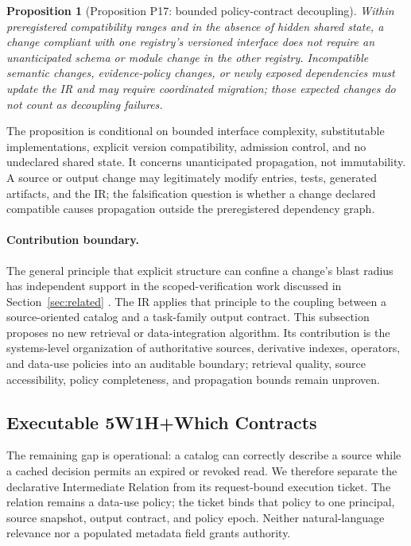 \documentclass[11pt]{article}
\newtheorem{proposition}{Proposition}
\begin{document}
\begin{proposition}[Proposition P17: bounded policy-contract decoupling]
\label{prop:p17}
Within preregistered compatibility ranges and in the absence of hidden shared state, a change compliant with one registry's versioned interface does not require an unanticipated schema or module change in the other registry. Incompatible semantic changes, evidence-policy changes, or newly exposed dependencies must update the IR and may require coordinated migration; those expected changes do not count as decoupling failures.
\end{proposition}

The proposition is conditional on bounded interface complexity, substitutable implementations, explicit version compatibility, admission control, and no undeclared shared state. It concerns unanticipated propagation, not immutability. A source or output change may legitimately modify entries, tests, generated artifacts, and the IR; the falsification question is whether a change declared compatible causes propagation outside the preregistered dependency graph.

\paragraph{Contribution boundary.}
The general principle that explicit structure can confine a change's blast radius has independent support in the scoped-verification work discussed in Section~\ref{sec:related} \cite{hsu2026grace}. The IR applies that principle to the coupling between a source-oriented catalog and a task-family output contract. This subsection proposes no new retrieval or data-integration algorithm. Its contribution is the systems-level organization of authoritative sources, derivative indexes, operators, and data-use policies into an auditable boundary; retrieval quality, source accessibility, policy completeness, and propagation bounds remain unproven.

\subsection{Executable 5W1H+Which Contracts}
\label{sec:executable-ir}

The remaining gap is operational: a catalog can correctly describe a source while a cached decision permits an expired or revoked read. We therefore separate the declarative Intermediate Relation from its request-bound execution ticket. The relation remains a data-use policy; the ticket binds that policy to one principal, source snapshot, output contract, and policy epoch. Neither natural-language relevance nor a populated metadata field grants authority.
\end{document}
